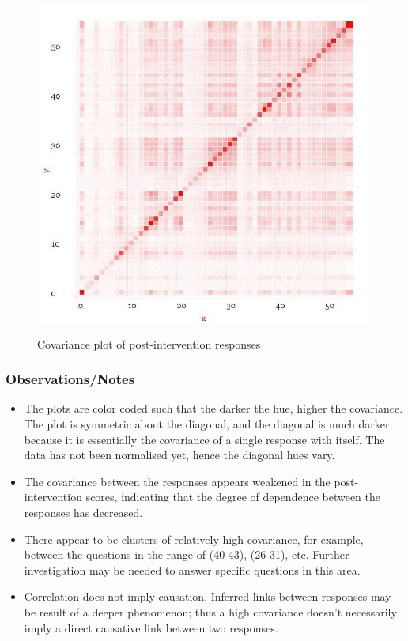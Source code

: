\documentclass[10pt]{article}
\begin{document}
\begin{figure}
\caption{Covariance plot of post-intervention responses}
\label{CovariancePost}
\begin{center}
\includegraphics[width=120mm]{ReportMedia/CovariancePost.jpg}\\
\end{center}
\end{figure}
\subsubsection{Observations/Notes}
\begin{itemize}
\item The plots are color coded such that the darker the hue, higher the covariance. The plot is symmetric about the diagonal, and the diagonal is much darker because it is essentially the covariance of a single response with itself. The data has not been normalised yet, hence the diagonal hues vary.
\item The covariance between the responses appears weakened in the post-intervention scores, indicating that the degree of dependence between the responses has decreased.
\item There appear to be clusters of relatively high covariance, for example, between the questions in the range of (40-43), (26-31), etc. Further investigation may be needed to answer specific questions in this area.
\item Correlation does not imply causation. Inferred links between responses may be result of a deeper phenomenon; thus a high covariance doesn't necessarily imply a direct causative link between two responses.

\end{itemize}
\end{document}
